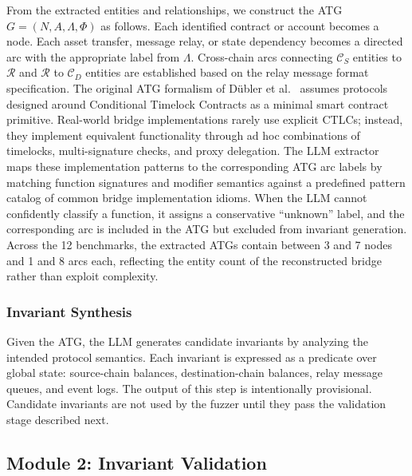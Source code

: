 \documentclass[journal]{IEEEtran}
\begin{document}
From the extracted entities and relationships, we construct the ATG $G = (N, A, \Lambda, \Phi)$ as follows. Each identified contract or account becomes a node. Each asset transfer, message relay, or state dependency becomes a directed arc with the appropriate label from $\Lambda$. Cross-chain arcs connecting $\mathcal{C}_S$ entities to $\mathcal{R}$ and $\mathcal{R}$ to $\mathcal{C}_D$ entities are established based on the relay message format specification. The original ATG formalism of D\"ubler et al.~\cite{dubler2025atg} assumes protocols designed around Conditional Timelock Contracts as a minimal smart contract primitive. Real-world bridge implementations rarely use explicit CTLCs; instead, they implement equivalent functionality through ad hoc combinations of timelocks, multi-signature checks, and proxy delegation. The LLM extractor maps these implementation patterns to the corresponding ATG arc labels by matching function signatures and modifier semantics against a predefined pattern catalog of common bridge implementation idioms. When the LLM cannot confidently classify a function, it assigns a conservative ``unknown'' label, and the corresponding arc is included in the ATG but excluded from invariant generation. Across the 12 benchmarks, the extracted ATGs contain between 3 and 7 nodes and 1 and 8 arcs each, reflecting the entity count of the reconstructed bridge rather than exploit complexity.

\subsubsection{Invariant Synthesis}

Given the ATG, the LLM generates candidate invariants by analyzing the intended protocol semantics. Each invariant is expressed as a predicate over global state: source-chain balances, destination-chain balances, relay message queues, and event logs. The output of this step is intentionally provisional. Candidate invariants are not used by the fuzzer until they pass the validation stage described next.

\subsection{Module 2: Invariant Validation}
\end{document}
